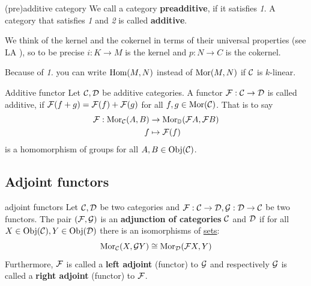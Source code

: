 \documentclass[twoside = false,	%
		headsepline,		%
		parskip = true,
		]{scrbook}						%
\begin{document}
        \begin{definition*}{(pre)additive category}
            We call a category \textbf{preadditive}, if it satisfies \textit{1}.
            A category that satisfies \textit{1} and \textit{2} is called \textbf{additive}.
        \end{definition*}

        \begin{remark*}{}
            We think of the kernel and the cokernel in terms of their universal properties (see LA \cite{LA}),
            so to be precise $i: K \rightarrow M$ is the kernel and $p: N \rightarrow C$ is the cokernel.
        \end{remark*}

        Because of \textit{1.} you can write $\mathrm{Hom}(M,N)$ instead of $\mathrm{Mor}(M,N)$ if $\mathcal C$ is $k$-linear.

        \begin{definition*}{Additive functor}
            Let $\mathcal C,\mathcal D$ be additive categories. A functor $\mathcal F: \mathcal C \to \mathcal D$ is called additive, if $\mathcal F(f + g) = \mathcal F(f) + \mathcal F(g)$ for all $f,g \in \mathrm{Mor}(\mathcal C)$. That is to say
            \begin{equation*}
            \begin{split}
                \mathcal F: \mathrm{Mor}_\mathcal C(A,B) &\to \mathrm{Mor}_\mathbb D(\mathcal F A, \mathcal F B) \\
                            f &\mapsto \mathcal F(f)
            \end{split}
            \end{equation*}
            is a homomorphism of groups for all $A,B \in \mathrm{Obj}(\mathcal C)$.
        \end{definition*}

        
        
    \subsection{Adjoint functors}
    
        \begin{definition*}{adjoint functors}
            Let $\mathcal C,\mathcal D$ be two categories and $\mathcal F: \mathcal C \to \mathcal D, \mathcal G: \mathcal D \to \mathcal C$ be two functors. The pair $(\mathcal F,\mathcal G)$ is an \textbf{adjunction of categories} $\mathcal C$ and $\mathcal D$ if for all $X \in \mathrm{Obj}(\mathcal C), Y \in \mathrm{Obj}(\mathcal D)$ there is an isomorphisms of \underline{sets}:
            \begin{equation*}
                \mathrm{Mor}_\mathcal C(X,\mathcal G Y) \cong \mathrm{Mor}_\mathcal D(\mathcal F X,Y)
            \end{equation*}
            Furthermore, $\mathcal F$ is called a \textbf{left adjoint} (functor) to $\mathcal G$ and respectively $\mathcal G$ is called a \textbf{right adjoint} (functor) to $\mathcal F$.
        \end{definition*}
        
\end{document}
